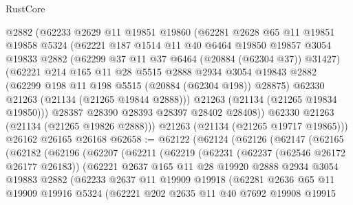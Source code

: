 \begin{lexlean}{RustCore}
\begin{coremodule}
        @2882
        (@62233
          @2629
          @11
          @19851
          @19860
          (@62281
            @2628
            @65
            @11
            @19851
            @19858
            @5324
            (@62221
              @187
              @1514
              @11
              @40
              @6464
              @19850
              @19857
              @3054
              @19833
              @2882
              (@62299 @37 @11 @37 @6464 (@20884 (@62304 @37)) @31427)
              (@62221
                @214
                @165
                @11
                @28
                @5515
                @2888
                @2934
                @3054
                @19843
                @2882
                (@62299 @198 @11 @198 @5515 (@20884 (@62304 @198)) @28875)
                @62330
                @21263
                (@21134 (@21265 @19844 @2888)))
              @21263
              (@21134 (@21265 @19834 @19850)))
            @28387
            @28390
            @28393
            @28397
            @28402
            @28408))
        @62330
        @21263
        (@21134 (@21265 @19826 @2888)))
      @21263
      (@21134 (@21265 @19717 @19865)))
    @26162
    @26165
    @26168
@62658 := @62122
    (@62124
      (@62126
        (@62147
          (@62165
            (@62182
              (@62196
                (@62207
                  (@62211
                    (@62219
                      (@62231
                        (@62237 (@62546 @26172 @26177 @26183))
                        (@62221
                          @2637
                          @165
                          @11
                          @28
                          @19920
                          @2888
                          @2934
                          @3054
                          @19883
                          @2882
                          (@62233
                            @2637
                            @11
                            @19909
                            @19918
                            (@62281
                              @2636
                              @65
                              @11
                              @19909
                              @19916
                              @5324
                              (@62221
                                @202
                                @2635
                                @11
                                @40
                                @7692
                                @19908
                                @19915

\end{coremodule}
\end{lexlean}
